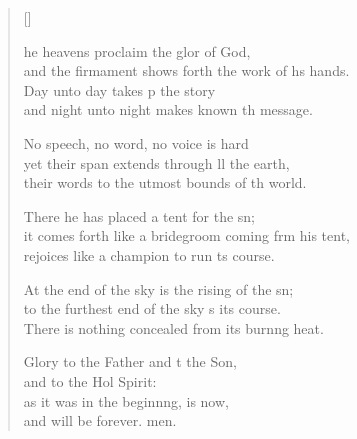 \settowidth{\versewidth}{it comes forth like a bridegroom coming from his tent, *}
\begin{verse}[\versewidth]
  \begin{patverse}
he heavens proclaim the glor of God,\Med\\
and the firmament shows forth the work of h\pointup{\i}s hands.\\
Day unto day takes p the story\Med\\
and night unto night makes known th message.

No speech, no word, no voice is hard\Flex\\
yet their span extends through ll the earth,\Med\\
their words to the utmost bounds of th world.

There he has placed a tent for the sn;\Flex\\
it comes forth like a bridegroom coming frm his tent,\Med\\
rejoices like a champion to run \pointup{\i}ts course.

At the end of the sky is the rising of the sn;\Flex\\
to the furthest end of the sky \pointup{\i}s its course.\Med\\
There is nothing concealed from its burn\pointup{\i}ng heat.

Glory to the Father and t the Son,\Med\\
and to the Hol Spirit:\\
as it was in the beginn\pointup{\i}ng, is now,\Med\\
and will be forever. men. 
  \end{patverse}
\end{verse}
